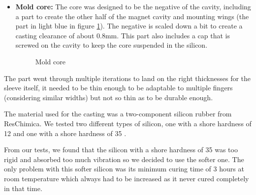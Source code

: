 \begin{itemize}
    \item \textbf{Mold core: } The core was designed to be the negative of the cavity, including a part to create the other half of the magnet cavity and mounting wings (the part in light blue in figure \ref{fig: mold_core}).
    The negative is scaled down a bit to create a casting clearance of about 0.8mm.
    This part also includes a cap that is screwed on the cavity to keep the core suspended in the silicon.
    \begin{figure}
        \centering
        \caption{Mold core}
        \label{fig: mold_core}
    \end{figure}
\end{itemize}

The part went through multiple iterations to land on the right thicknesses for the sleeve itself, it needed to be thin enough to be adaptable to multiple fingers (considering similar widths) but not so thin as to be durable enough.

The material used for the casting was a two-component silicon rubber from ResChimica.
We tested two different types of silicon, one with a shore hardness of 12 \cite{R_Pro_10_silicon} and one with a shore hardness of 35 \cite{R_Pro_Fast_silicon}.

From our tests, we found that the silicon with a shore hardness of 35 was too rigid and absorbed too much vibration so we decided to use the softer one.
The only problem with this softer silicon was its minimum curing time of 3 hours at room temperature which always had to be increased as it never cured completely in that time.

